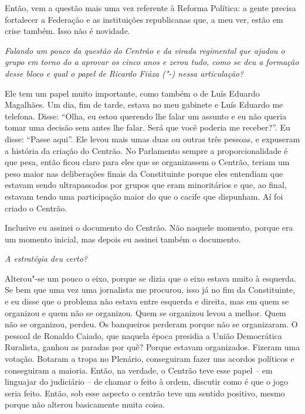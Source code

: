 Então, vem a questão mais uma vez referente à Reforma Política: a gente
precisa fortalecer a Federação e as instituições republicanas que, a meu
ver, estão em crise também. Isso não é novidade.

\medskip

\noindent\emph{Falando um pouco da questão do Centrão e da virada regimental
que ajudou o grupo em torno do  a aprovar os cinco anos e zerou tudo,
como se deu a formação desse bloco e qual o papel de Ricardo Fiúza
("-) nessa articulação? }

Ele tem um papel muito importante, como também o de
Luís Eduardo Magalhães. Um dia, fim de tarde, estava no meu gabinete e
Luís Eduardo me telefona. Disse: ``Olha, eu estou querendo lhe falar um
assunto e eu não queria tomar uma decisão sem antes lhe falar. Será que
você poderia me receber?''. Eu disse: ``Passe aqui''. Ele levou mais
umas duas ou outras três pessoas, e expuseram a história da criação do
Centrão. No Parlamento sempre a proporcionalidade é que pesa, então
ficou claro para eles que se organizassem o Centrão, teriam um peso
maior nas deliberações finais da Constituinte porque eles entendiam que
estavam sendo ultrapassados por grupos que eram minoritários e que, ao
final, estavam tendo uma participação maior do que o cacife que
dispunham. Aí foi criado o Centrão.

Inclusive eu assinei o documento do Centrão. Não naquele momento, porque
era um momento inicial, mas depois eu assinei também o documento.

\medskip

\noindent\emph{A estratégia deu certo?}

Alterou"-se um pouco o eixo, porque se dizia que o eixo
estava muito à esquerda. Se bem que uma vez uma jornalista me procurou,
isso já no fim da Constituinte, e eu disse que o problema não estava
entre esquerda e direita, mas em quem se organizou e quem não se
organizou. Quem se organizou levou a melhor. Quem não se organizou,
perdeu. Os banqueiros perderam porque não se organizaram. O pessoal de
Ronaldo Caiado, que naquela época presidia a União Democrática
Ruralista, ganhou as paradas por quê? Porque estavam organizados.
Fizeram uma votação. Botaram a tropa no Plenário, conseguiram fazer uns
acordos políticos e conseguiram a maioria. Então, na verdade, o Centrão
teve esse papel -- em linguajar do judiciário -- de chamar o feito à
ordem, discutir como é que o jogo seria feito. Então, sob esse aspecto o
centrão teve um sentido positivo, mesmo porque não alterou basicamente
muita coisa.

